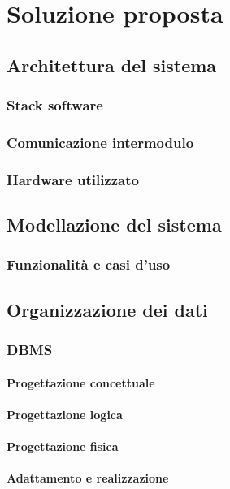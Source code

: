 \section{Soluzione proposta}
\label{sec:soluzione}

\subsection{Architettura del sistema}
\subsubsection{Stack software}
\subsubsection{Comunicazione intermodulo}
\subsubsection{Hardware utilizzato}

\subsection{Modellazione del sistema}
\subsubsection{Funzionalità e casi d'uso}

\subsection{Organizzazione dei dati}
\subsubsection{DBMS}
\paragraph{Progettazione concettuale}
\paragraph{Progettazione logica}
\paragraph{Progettazione fisica}
\paragraph{Adattamento e realizzazione}
